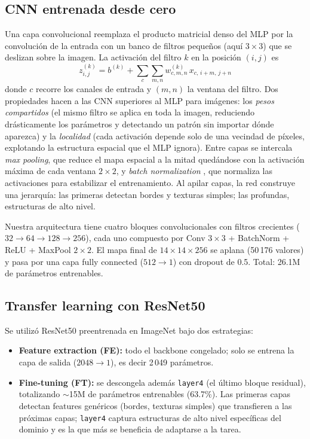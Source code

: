 \documentclass[conference]{IEEEtran}
\begin{document}
\subsection{CNN entrenada desde cero}

Una capa convolucional reemplaza el producto matricial denso del MLP por la convolución de la entrada con un banco de filtros pequeños (aquí $3 \times 3$) que se deslizan sobre la imagen. La activación del filtro $k$ en la posición $(i,j)$ es
\begin{equation}
z^{(k)}_{i,j} = b^{(k)} + \sum_{c} \sum_{m,n} w^{(k)}_{c,m,n} \, x_{c,\,i+m,\,j+n}
\end{equation}
donde $c$ recorre los canales de entrada y $(m,n)$ la ventana del filtro. Dos propiedades hacen a las CNN superiores al MLP para imágenes: los \emph{pesos compartidos} (el mismo filtro se aplica en toda la imagen, reduciendo drásticamente los parámetros y detectando un patrón sin importar dónde aparezca) y la \emph{localidad} (cada activación depende solo de una vecindad de píxeles, explotando la estructura espacial que el MLP ignora). Entre capas se intercala \emph{max pooling}, que reduce el mapa espacial a la mitad quedándose con la activación máxima de cada ventana $2 \times 2$, y \emph{batch normalization} \cite{batchnorm}, que normaliza las activaciones para estabilizar el entrenamiento. Al apilar capas, la red construye una jerarquía: las primeras detectan bordes y texturas simples; las profundas, estructuras de alto nivel.

Nuestra arquitectura tiene cuatro bloques convolucionales con filtros crecientes ($32 \to 64 \to 128 \to 256$), cada uno compuesto por Conv $3\times3$ + BatchNorm + ReLU + MaxPool $2\times2$. El mapa final de $14 \times 14 \times 256$ se aplana (50\,176 valores) y pasa por una capa fully connected ($512 \to 1$) con dropout de 0.5. Total: 26.1M de parámetros entrenables.

\subsection{Transfer learning con ResNet50}

Se utilizó ResNet50 \cite{resnet} preentrenada en ImageNet \cite{imagenet} bajo dos estrategias:

\begin{itemize}
\item \textbf{Feature extraction (FE):} todo el backbone congelado; solo se entrena la capa de salida ($2048 \to 1$), es decir 2\,049 parámetros.
\item \textbf{Fine-tuning (FT):} se descongela además \texttt{layer4} (el último bloque residual), totalizando $\sim$15M de parámetros entrenables (63.7\%). Las primeras capas detectan features genéricos (bordes, texturas simples) que transfieren a las próximas capas; \texttt{layer4} captura estructuras de alto nivel específicas del dominio y es la que más se beneficia de adaptarse a la tarea.
\end{itemize}
\end{document}
